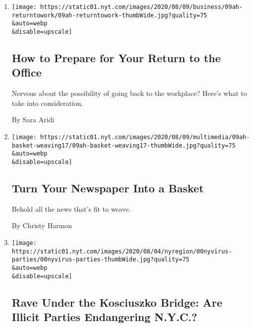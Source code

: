 \begin{enumerate}
\def\labelenumi{\arabic{enumi}.}
\item
  \href{/2020/08/08/at-home/office-return-coronavirus.html}{}

  \texttt{[image: https://static01.nyt.com/images/2020/08/09/business/09ah-returntowork/09ah-returntowork-thumbWide.jpg?quality=75\\\&auto=webp\\\&disable=upscale]}

  \hypertarget{how-to-prepare-for-your-return-to-the-office}{%
  \subsection{How to Prepare for Your Return to the
  Office}\label{how-to-prepare-for-your-return-to-the-office}}

  Nervous about the possibility of going back to the workplace? Here's
  what to take into consideration.

  By Sara Aridi
\item
  \href{/2020/08/08/at-home/coronavirus-newspaper-basket.html}{}

  \texttt{[image: https://static01.nyt.com/images/2020/08/09/multimedia/09ah-basket-weaving17/09ah-basket-weaving17-thumbWide.jpg?quality=75\\\&auto=webp\\\&disable=upscale]}

  \hypertarget{turn-your-newspaper-into-a-basket}{%
  \subsection{Turn Your Newspaper Into a
  Basket}\label{turn-your-newspaper-into-a-basket}}

  Behold all the news that's fit to weave.

  By Christy Harmon
\item
  \href{/2020/08/08/nyregion/nyc-illegal-parties.html}{}

  \texttt{[image: https://static01.nyt.com/images/2020/08/04/nyregion/00nyvirus-parties/00nyvirus-parties-thumbWide.jpg?quality=75\\\&auto=webp\\\&disable=upscale]}

  \hypertarget{rave-under-the-kosciuszko-bridge-are-illicit-parties-endangering-nyc}{%
  \subsection{Rave Under the Kosciuszko Bridge: Are Illicit Parties
  Endangering
  N.Y.C.?}\label{rave-under-the-kosciuszko-bridge-are-illicit-parties-endangering-nyc}}


\end{enumerate}
